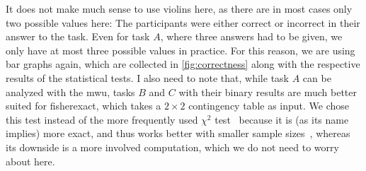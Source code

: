 \documentclass[../thesis]{subfiles}
\begin{document}
It does not make much sense to use \glspl{violin} here, as there are in most cases only two possible values here:
The participants were either correct or incorrect in their answer to the task.
Even for task $A$, where three answers had to be given, we only have at most three possible values in practice.
For this reason, we are using bar graphs again, which are collected in \cref{fig:correctness} along with the respective results of the statistical tests.
I also need to note that, while task $A$ can be analyzed with the \gls{mwu}, tasks $B$ and $C$ with their binary results are much better suited for \gls{fisherexact}, which takes a $2 \times 2$ contingency table as input.
We chose this test instead of the more frequently used $\chi^2$ test~\cite{pearson1900} because it is (as its name implies) more exact, and thus works better with smaller sample sizes~\cite{fisher1922}, whereas its downside is a more involved computation, which we do not need to worry about here.
\end{document}

